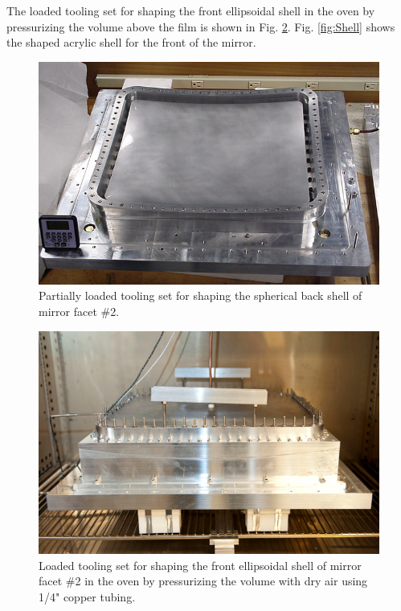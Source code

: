 The loaded tooling set for shaping the front ellipsoidal shell in the oven by pressurizing the volume above the film is shown in  Fig. \ref{fig:Pres_Shaping_Front}. Fig. \ref{fig:Shell} shows the shaped acrylic shell for the front of the mirror.

\begin{figure}[ht]
    \centering
    \includegraphics[width=0.95\linewidth]{images/Vac_Mol_Back.png}
    \caption{Partially loaded tooling set for shaping the spherical back shell of mirror facet \#2.}
    \label{fig:Vac_Mol_Back}
\end{figure}

\begin{figure}[ht]
    \centering
    \includegraphics[width=0.95\linewidth]{images/Pres_Shaping_Front.png}
    \caption{Loaded tooling set for shaping the front ellipsoidal shell of mirror facet \#2 in the oven by pressurizing the volume with dry air using 1/4" copper tubing. }
    \label{fig:Pres_Shaping_Front}
\end{figure}

